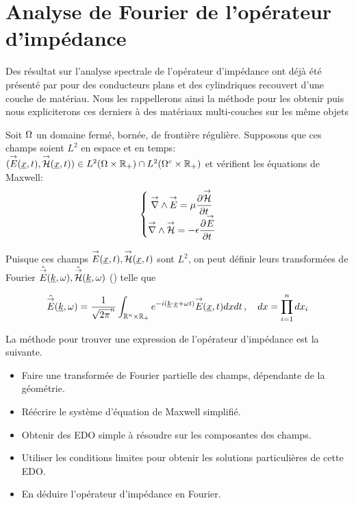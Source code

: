 \section{Analyse de Fourier de l'opérateur d'impédance}

Des résultat sur l'analyse spectrale de l'opérateur d'impédance ont déjà été présenté par \cite{hoppe_impedance_1995} pour des conducteurs plans et des cylindriques recouvert d'une couche de matériau. Nous les rappellerons ainsi la méthode pour les obtenir puis nous expliciterons ces derniers à des matériaux multi-couches sur les même objets


Soit $\Omega$ un domaine fermé, bornée, de frontière régulière. Supposons que ces champs soient $L^2$ en espace et en temps: $({\overset{\rightarrow}{E}}(\underline{x},t),{\overset{\rightarrow}{\mathcal{H}}}(\underline{x},t)) \in L^2(\Omega \times \mathbb R_+) \cap L^2(\Omega^c\times\mathbb R_+)$ et vérifient les équations de Maxwell:
\begin{equation}
    \left\lbrace 
    \begin{matrix}
    {\overset{\rightarrow}{\nabla}}\wedge {\overset{\rightarrow}{E}} = \mu \dfrac{\partial^{{}} {\overset{\rightarrow}{\mathcal{H}}}}{{\partial t}^{{}}} \\
    {\overset{\rightarrow}{\nabla}}\wedge {\overset{\rightarrow}{\mathcal{H}}} = -\epsilon \dfrac{\partial^{{}} {\overset{\rightarrow}{E}}}{{\partial t}^{{}}}
    \end{matrix}
    \right.
\end{equation}

Puisque ces champs ${\overset{\rightarrow}{E}}(\underline{x},t),{\overset{\rightarrow}{\mathcal{H}}}(\underline{x},t)$ sont $L^2$, on peut définir leurs transformées de Fourier $\hat{{\overset{\rightarrow}{E}}}(\underline{k},\omega), \hat{{\overset{\rightarrow}{\mathcal{H}}}}(\underline{k},\omega)$ (\cite[Théorème de Plancherel, p.~153]{yosida_functional_1995}) telle que

\begin{equation}
    \hat{{\overset{\rightarrow}{E}}} (\underline{k},\omega) = \dfrac{1}{\sqrt{2\pi}^n}\int_{\mathbb R^n\times\mathbb R_+} e^{-i(\underline{k} \cdot \underline{x}+\omega t)}{\overset{\rightarrow}{E}}(\underline{x},t) dxdt\,, \quad dx = \prod\limits_{i=1}^n dx_i
\end{equation}

La méthode pour trouver une expression de l'opérateur d'impédance est la suivante.
\begin{itemize}
\item Faire une transformée de Fourier partielle des champs, dépendante de la géométrie.
\item Réécrire le système d'équation de Maxwell simplifié.
\item Obtenir des EDO simple à résoudre sur les composantes des champs.
\item Utiliser les conditions limites pour obtenir les solutions particulières de cette EDO. 
\item En déduire l'opérateur d'impédance en Fourier.
\end{itemize}

